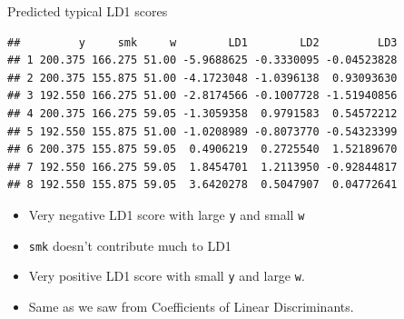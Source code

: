 \documentclass[ignorenonframetext,]{beamer}
\newenvironment{Shaded}{\begin{snugshade}}{\end{snugshade}}
\newcommand{\KeywordTok}[1]{\textcolor[rgb]{0.13,0.29,0.53}{\textbf{#1}}}
\newcommand{\NormalTok}[1]{#1}
\newcommand{\OperatorTok}[1]{\textcolor[rgb]{0.81,0.36,0.00}{\textbf{#1}}}
\newcommand{\StringTok}[1]{\textcolor[rgb]{0.31,0.60,0.02}{#1}}
\begin{document}
\begin{frame}[fragile]{Predicted typical LD1 scores}
\protect\hypertarget{predicted-typical-ld1-scores}{}

\footnotesize

\begin{Shaded}
\end{Shaded}

\begin{verbatim}
##         y     smk     w        LD1        LD2         LD3
## 1 200.375 166.275 51.00 -5.9688625 -0.3330095 -0.04523828
## 2 200.375 155.875 51.00 -4.1723048 -1.0396138  0.93093630
## 3 192.550 166.275 51.00 -2.8174566 -0.1007728 -1.51940856
## 4 200.375 166.275 59.05 -1.3059358  0.9791583  0.54572212
## 5 192.550 155.875 51.00 -1.0208989 -0.8073770 -0.54323399
## 6 200.375 155.875 59.05  0.4906219  0.2725540  1.52189670
## 7 192.550 166.275 59.05  1.8454701  1.2113950 -0.92844817
## 8 192.550 155.875 59.05  3.6420278  0.5047907  0.04772641
\end{verbatim}

\normalsize

\begin{itemize}
\item
  Very negative LD1 score with large \texttt{y} and small \texttt{w}
\item
  \texttt{smk} doesn't contribute much to LD1
\item
  Very positive LD1 score with small \texttt{y} and large \texttt{w}.
\item
  Same as we saw from Coefficients of Linear Discriminants.
\end{itemize}

\end{frame}
\end{document}
